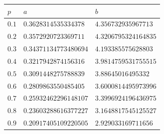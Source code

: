 \begin{center}
\begin{tabular}{ | m{1cm} | m{4cm}| m{4cm} | }
\hline
$p$&$a$&$b$\\
\hline
$0.1$&$0.3628314535334378$&$4.356732935967713$\\
\hline
$0.2$&$0.3572920723369711$&$4.3206795324164835$\\
\hline
$0.3$&$0.34371134773480694$&$4.193385575628803$\\
\hline
$0.4$&$0.3217942874156316$&$3.9814759531755515$\\
\hline
$0.5$&$0.3091448275788839$&$3.88645016495332$\\
\hline
$0.6$&$0.2809863550485405$&$3.6000814495973996$\\
\hline
$0.7$&$0.25932462296148107$&$3.3996924196436975$\\
\hline
$0.8$&$0.23603288616377227$&$3.1648817545125527$\\
\hline
$0.9$&$0.20917405109220505$&$2.929033169711656$\\
\hline
\end{tabular}
\end{center}
